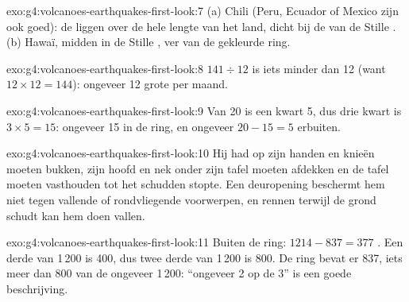 \begin{solution}{exo:g4:volcanoes-earthquakes-first-look:7}
(a) Chili (Peru, Ecuador of Mexico zijn ook goed): de  liggen over
de hele lengte van het land, dicht bij de  van de Stille .
(b) Hawaï, midden in de Stille , ver van de gekleurde ring.
\end{solution}

\begin{solution}{exo:g4:volcanoes-earthquakes-first-look:8}
$141 \div 12$ is iets minder dan 12 (want $12 \times 12 = 144$): ongeveer
12 grote  per maand.
\end{solution}

\begin{solution}{exo:g4:volcanoes-earthquakes-first-look:9}
Van 20 is een kwart 5, dus drie kwart is $3 \times 5 = 15$: ongeveer 15
in de ring, en ongeveer $20 - 15 = 5$ erbuiten.
\end{solution}

\begin{solution}{exo:g4:volcanoes-earthquakes-first-look:10}
Hij had op zijn handen en knieën moeten bukken, zijn hoofd en nek onder zijn
tafel moeten afdekken en de tafel moeten vasthouden tot het schudden
stopte. Een deuropening beschermt hem niet tegen vallende of rondvliegende
voorwerpen, en rennen terwijl de grond schudt kan hem doen vallen.
\end{solution}

\begin{solution}{exo:g4:volcanoes-earthquakes-first-look:11}
Buiten de ring: $1214 - 837 = 377$ . Een derde van 1\,200 is 400,
dus twee derde van 1\,200 is 800. De ring bevat er 837, iets meer dan 800
van de ongeveer 1\,200: ``ongeveer 2 op de 3'' is een goede beschrijving.
\end{solution}
